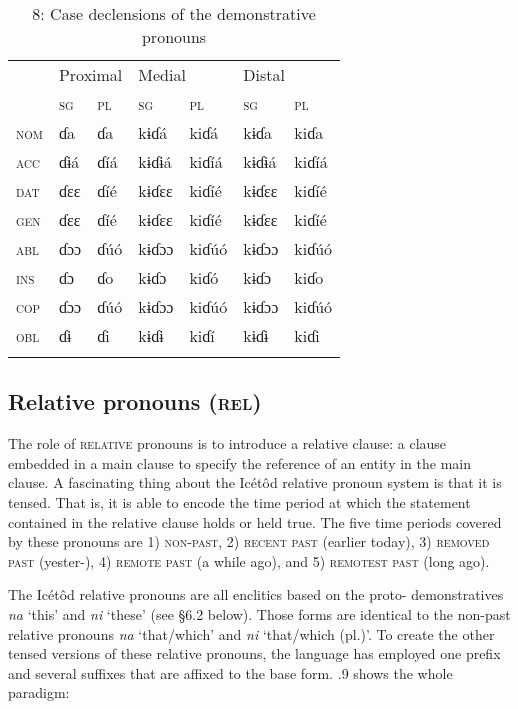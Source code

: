 \begin{table}
\caption{8: Case declensions of the demonstrative pronouns}
\label{tab:5}


\begin{tabularx}{\textwidth}{XXXXXXX} & \multicolumn{2}{X}{ Proximal} & \multicolumn{2}{X}{ Medial} & \multicolumn{2}{X}{ Distal}\\
\lsptoprule
& \textsc{sg} & \textsc{pl} & \textsc{sg} & \textsc{pl} & \textsc{sg} & \textsc{pl}\\
\textsc{nom} & ɗa & ɗa & kɨɗá & kiɗá & kɨɗa & kiɗa\\
\textsc{acc} & ɗɨá & ɗíá & kɨɗɨá & kiɗíá & kɨɗɨá & kiɗíá\\
\textsc{dat} & ɗɛɛ & ɗíé & kɨɗɛɛ & kiɗíé & kɨɗɛɛ & kiɗíé\\
\textsc{gen} & ɗɛɛ & ɗíé & kɨɗɛɛ & kiɗíé & kɨɗɛɛ & kiɗíé\\
\textsc{abl} & ɗɔɔ & ɗúó & kɨɗɔɔ & kiɗúó & kɨɗɔɔ & kiɗúó\\
\textsc{ins} & ɗɔ & ɗo & kɨɗɔ & kiɗó & kɨɗɔ & kiɗo\\
\textsc{cop} & ɗɔɔ & ɗúó & kɨɗɔɔ & kiɗúó & kɨɗɔɔ & kiɗúó\\
\textsc{obl} & ɗɨ & ɗi & kɨɗɨ & kiɗí & kɨɗɨ & kiɗi\\
\lspbottomrule
\end{tabularx}
\end{table}



\subsection{Relative pronouns (\textsc{rel})}


The role of \textsc{relative} pronouns is to introduce a relative clause: a clause embedded in a main clause to specify the reference of an entity in the main clause. A fascinating thing about the Icétôd relative pronoun system is that it is tensed. That is, it is able to encode the time period at which the statement contained in the relative clause holds or held true. The five time periods covered by these pronouns are 1) \textsc{non-past}, 2) \textsc{recent past} (earlier today), 3) \textsc{removed past} (yester-), 4) \textsc{remote past} (a while ago), and 5) \textsc{remotest past} (long ago).

The Icétôd relative pronouns are all enclitics based on the proto- demonstratives \textit{na} ‘this’ and \textit{ni} ‘these’ (see §6.2 below). Those forms are identical to the non-past relative pronouns \textit{na} ‘that/which’ and \textit{ni} ‘that/which (pl.)’. To create the other tensed versions of these relative pronouns, the language has employed one prefix and several suffixes that are affixed to the base form. .9 shows the whole paradigm:


